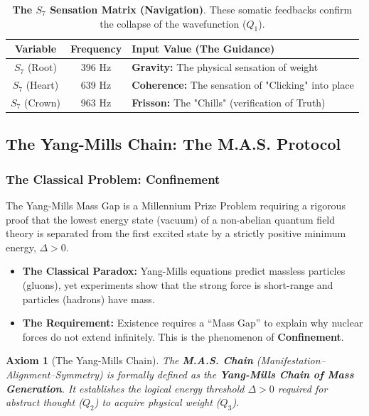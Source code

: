 \documentclass[12pt]{amsart}
\newtheorem{axiom}[theorem]{Axiom}
\begin{document}
\begin{table}[h]
    \centering
    \begin{tabular}{|c|c|l|}
        \hline
        \textbf{Variable} & \textbf{Frequency} & \textbf{Input Value (The Guidance)} \\
        \hline
        $S_7$ (Root) & 396 Hz & \textbf{Gravity:} The physical sensation of weight \\
        $S_7$ (Heart) & 639 Hz & \textbf{Coherence:} The sensation of "Clicking" into place \\
        $S_7$ (Crown) & 963 Hz & \textbf{Frisson:} The "Chills" (verification of Truth) \\
        \hline
    \end{tabular}
    \caption{\textbf{The $S_7$ Sensation Matrix (Navigation)}. These somatic feedbacks confirm the collapse of the wavefunction ($Q_1$).}
    \label{tab:s7_matrix}
\end{table}

\subsection{The Yang-Mills Chain: The M.A.S. Protocol}\label{sec:11.3}

\subsubsection{The Classical Problem: Confinement}\label{sec:11.3.1}
The Yang-Mills Mass Gap is a Millennium Prize Problem requiring a rigorous proof that the lowest energy state (vacuum) of a non-abelian quantum field theory is separated from the first excited state by a strictly positive minimum energy, $\Delta > 0$.
\begin{itemize}
    \item \textbf{The Classical Paradox:} Yang-Mills equations predict massless particles (gluons), yet experiments show that the strong force is short-range and particles (hadrons) have mass.
    \item \textbf{The Requirement:} Existence requires a ``Mass Gap'' to explain why nuclear forces do not extend infinitely. This is the phenomenon of \textbf{Confinement}.
\end{itemize}

\begin{axiom}[The Yang-Mills Chain]
The \textbf{M.A.S. Chain} (Manifestation--Alignment--Symmetry) is formally defined as the \textbf{Yang-Mills Chain of Mass Generation}. It establishes the logical energy threshold $\Delta > 0$ required for abstract thought ($Q_2$) to acquire physical weight ($Q_3$).
\end{axiom}
\end{document}
